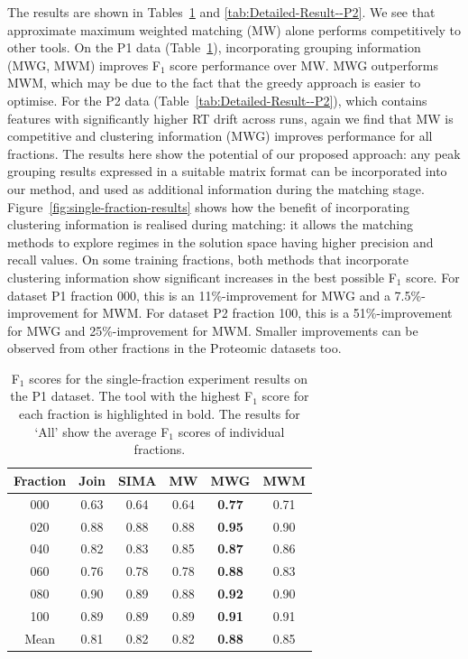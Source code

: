 The results are shown in Tables~\ref{tab:Detailed-Result--P1} and \ref{tab:Detailed-Result--P2}. We see that approximate maximum weighted matching (MW) alone performs competitively to other tools. On the P1 data (Table~\ref{tab:Detailed-Result--P1}), incorporating grouping information (MWG, MWM) improves F$_{1}$ score performance over MW. MWG outperforms MWM, which may be due to the fact that the greedy approach is easier to optimise. For the P2 data (Table~\ref{tab:Detailed-Result--P2}), which contains features with significantly higher RT drift across runs, again we find that MW is competitive and clustering information (MWG) improves performance for all fractions. The results here show the potential of our proposed approach: any peak grouping results expressed in a suitable matrix format can be incorporated into our method, and used as additional information during the matching stage. Figure~\ref{fig:single-fraction-results} shows how the benefit of incorporating clustering information is realised during matching: it allows the matching methods to explore regimes in the solution space having higher precision and recall values. On some training fractions, both methods that incorporate clustering information show significant increases in the best possible F$_1$ score. For dataset P1 fraction 000, this is an 11\%-improvement for MWG and a 7.5\%-improvement for MWM. For dataset P2 fraction 100, this is a 51\%-improvement for MWG and 25\%-improvement for MWM. Smaller improvements can be observed from other fractions in the Proteomic datasets too.

\begin{table}[!htbp]
\begin{centering}
\begin{tabular}{|c|c|c|c|c|c|}
\hline 
{Fraction} & {Join} & {SIMA} & {MW} & {MWG} & {MWM}\tabularnewline
\hline 
\hline 
{000} & {0.63} & {0.64} & {0.64} & \textbf{0.77} & {0.71}\tabularnewline
\hline 
{020} & {0.88} & {0.88} & {0.88} & \textbf{0.95} & {0.90}\tabularnewline
\hline 
{040} & {0.82} & {0.83} & {0.85} & \textbf{0.87} & {0.86}\tabularnewline
\hline 
{060} & {0.76} & {0.78} & {0.78} & \textbf{0.88} & {0.83}\tabularnewline
\hline 
{080} & {0.90} & {0.89} & {0.88} & \textbf{0.92} & {0.90}\tabularnewline
\hline 
{100} & {0.89} & {0.89} & {0.89} & \textbf{0.91} & {0.91}\tabularnewline
\hline 
{Mean} & {0.81} & {0.82} & {0.82} & \textbf{0.88} & {0.85}\tabularnewline
\hline 
\end{tabular}
\par\end{centering}
\caption{\label{tab:Detailed-Result--P1}F$_1$ scores for the single-fraction experiment results on the P1 dataset. The tool with the highest F$_1$ score for each fraction is highlighted in bold. The results for `All' show the average F$_1$ scores of individual fractions.}
\end{table}

